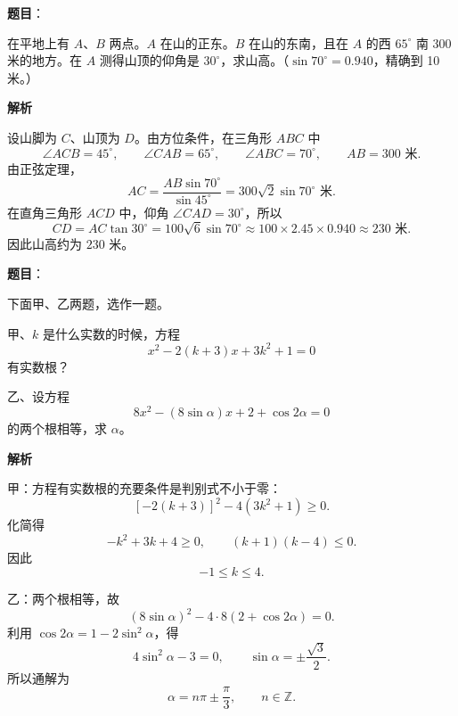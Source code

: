 \begin{answer}

\textbf{题目}：

在平地上有 $A$、$B$ 两点。$A$ 在山的正东。$B$ 在山的东南，且在 $A$ 的西 $65^\circ$ 南 $300$ 米的地方。在 $A$ 测得山顶的仰角是 $30^\circ$，求山高。（$\sin70^\circ=0.940$，精确到 10 米。）
\nopagebreak[4]
\begin{center}\end{center}
\nopagebreak[4]
\textbf{解析}

设山脚为 $C$、山顶为 $D$。由方位条件，在三角形 $ABC$ 中
\[
\angle ACB=45^\circ,
\qquad \angle CAB=65^\circ,
\qquad \angle ABC=70^\circ,
\qquad AB=300\text{ 米}.
\]
由正弦定理，
\[
AC=\frac{AB\sin70^\circ}{\sin45^\circ}
=300\sqrt2\sin70^\circ\text{ 米}.
\]
在直角三角形 $ACD$ 中，仰角 $\angle CAD=30^\circ$，所以
\[
CD=AC\tan30^\circ
=100\sqrt6\sin70^\circ
\approx100\times2.45\times0.940
\approx230\text{ 米}.
\]
因此山高约为 $230$ 米。


\end{answer}
\begin{answer}

\textbf{题目}：

下面甲、乙两题，选作一题。

甲、$k$ 是什么实数的时候，方程
\[
x^2-2(k+3)x+3k^2+1=0
\]
有实数根？

乙、设方程
\[
8x^2-(8\sin\alpha)x+2+\cos2\alpha=0
\]
的两个根相等，求 $\alpha$。

\textbf{解析}

甲：方程有实数根的充要条件是判别式不小于零：
\[
[-2(k+3)]^2-4(3k^2+1)\ge0.
\]
化简得
\[
-k^2+3k+4\ge0,
\qquad (k+1)(k-4)\le0.
\]
因此
\[
-1\le k\le4.
\]

乙：两个根相等，故
\[
(8\sin\alpha)^2-4\cdot8(2+\cos2\alpha)=0.
\]
利用 $\cos2\alpha=1-2\sin^2\alpha$，得
\[
4\sin^2\alpha-3=0,
\qquad \sin\alpha=\pm\frac{\sqrt3}{2}.
\]
所以通解为
\[
\alpha=n\pi\pm\frac\pi3,
\qquad n\in\mathbb Z.
\]


\end{answer}